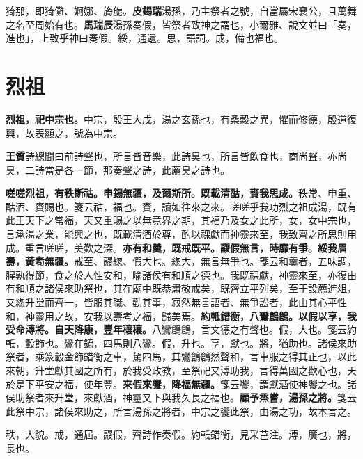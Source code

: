 \begin{quoting}猗那，即猗儺、婀娜、旖旎。\textbf{皮錫瑞}湯孫，乃主祭者之號，自當屬宋襄公，且萬舞之名至周始有也。\textbf{馬瑞辰}湯孫奏假，皆祭者致神之謂也，小爾雅、說文並曰「奏，進也」，上致乎神曰奏假。綏，通遺。思，語詞。成，備也福也。\end{quoting}

\section{烈祖}


\textbf{烈祖，祀中宗也。}{\footnotesize 中宗，殷王大戊，湯之玄孫也，有桑穀之異，懼而修德，殷道復興，故表顯之，號為中宗。}

\begin{quoting}\textbf{王質}詩總聞曰前詩聲也，所言皆音樂，此詩臭也，所言皆飲食也，商尚聲，亦尚臭，二詩當是各一節，那奏聲之詩，此薦臭之詩也。\end{quoting}

\textbf{嗟嗟烈祖，有秩斯祜。申錫無疆，及爾斯所。既載清酤，賚我思成。}{\footnotesize 秩常、申重、酤酒、賚賜也。箋云祜，福也。賚，讀如往來之來。嗟嗟乎我功烈之祖成湯，既有此王天下之常福，天又重賜之以無竟界之期，其福乃及女之此所，女，女中宗也，言承湯之業，能興之也，既載清酒於尊，酌以祼獻而神靈來至，我致齊之所思則用成。重言嗟嗟，美歎之深。}\textbf{亦有和羹，既戒既平。鬷假無言，時靡有爭。綏我眉壽，黃耇無疆。}{\footnotesize 戒至、鬷緫、假大也。緫大，無言無爭也。箋云和羹者，五味調，腥孰得節，食之於人性安和，喻諸侯有和順之德也。我既祼獻，神靈來至，亦復由有和順之諸侯來助祭也，其在廟中既恭肅敬戒矣，既齊立平列矣，至于設薦進俎，又緫升堂而齊一，皆服其職、勸其事，寂然無言語者、無爭訟者，此由其心平性和，神靈用之故，安我以壽考之福，歸美焉。}\textbf{約軧錯衡，八鸞鶬鶬。以假以享，我受命溥將。自天降康，豐年穰穰。}{\footnotesize 八鸞鶬鶬，言文德之有聲也。假，大也。箋云約軧，轂飾也。鸞在鑣，四馬則八鸞。假，升也。享，獻也。將，猶助也。諸侯來助祭者，乘篆轂金飾錯衡之車，駕四馬，其鸞鶬鶬然聲和，言車服之得其正也，以此來朝，升堂獻其國之所有，於我受政教，至祭祀又溥助我，言得萬國之歡心也，天於是下平安之福，使年豐。}\textbf{來假來饗，降福無疆。}{\footnotesize 箋云饗，謂獻酒使神饗之也。諸侯助祭者來升堂，來獻酒，神靈又下與我久長之福也。}\textbf{顧予烝嘗，湯孫之將。}{\footnotesize 箋云此祭中宗，諸侯來助之，所言湯孫之將者，中宗之饗此祭，由湯之功，故本言之。}

\begin{quoting}秩，大貌。戒，通屆。鬷假，齊詩作奏假。約軧錯衡，見采芑注。溥，廣也，將，長也。\end{quoting}

